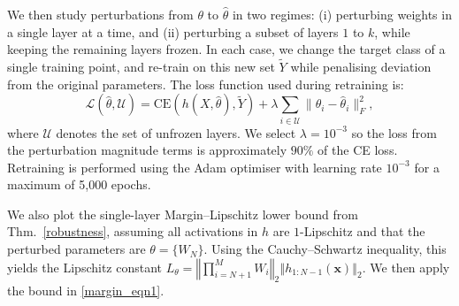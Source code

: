\documentclass{article}
\theoremstyle{plain}
\theoremstyle{definition}
\theoremstyle{remark}
\begin{document}
 We then study perturbations from \(\theta\) to \(\hat{\theta}\) in two regimes: (i) perturbing weights in a single layer at a time, and (ii) perturbing a subset of layers \(1\) to \(k\), while keeping the remaining layers frozen. In each case, we change the target class of a single training point, and re-train on this new set $\tilde{Y}$ while penalising deviation from the original parameters. The loss function used during retraining is:
\begin{equation}
\mathcal{L}(\hat{\theta}, \mathcal{U}) = \mathrm{CE}(h(X, \hat{\theta}), \tilde{Y}) + \lambda \sum_{i \in \mathcal{U}} \| \theta_i - \hat{\theta}_i \|_F^2,
\end{equation}
where $\mathcal{U}$ denotes the set of unfrozen layers. We select $\lambda=10^{-3}$ so the loss from the perturbation magnitude terms is approximately $90\%$ of the CE loss. Retraining is performed using the Adam optimiser with learning rate $10^{-3}$ for a maximum of 5,000 epochs. 

We also plot the single-layer Margin--Lipschitz lower bound from Thm.~\ref{robustness}, assuming all activations in $h$ are $1$-Lipschitz and that the perturbed parameters are $\theta=\{W_N\}$.
Using the Cauchy--Schwartz inequality, this yields the Lipschitz constant
$L_\theta = \left\Vert \prod_{i=N+1}^M W_i \right\Vert_2 \left\Vert h_{1:N-1} (\mathbf{x}) \right\Vert_2$.
We then apply the bound in \eqref{margin_eqn1}.


\end{document}
